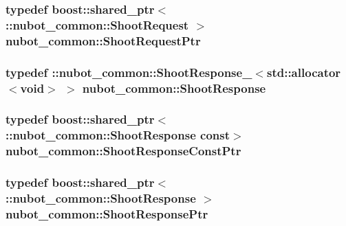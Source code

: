 \hypertarget{namespacenubot__common_aab5a1233cee5cd37a060be382351f99d}{
\subsubsection[{Shoot\-Request\-Ptr}]{\setlength{\rightskip}{0pt plus 5cm}typedef boost\-::shared\-\_\-ptr$<$ \-::{\bf nubot\-\_\-common\-::\-Shoot\-Request} $>$ {\bf nubot\-\_\-common\-::\-Shoot\-Request\-Ptr}}}\label{namespacenubot__common_aab5a1233cee5cd37a060be382351f99d}
\hypertarget{namespacenubot__common_a7fc7346cebf4ea3bdbc7c25438d3959e}{
\subsubsection[{Shoot\-Response}]{\setlength{\rightskip}{0pt plus 5cm}typedef \-::{\bf nubot\-\_\-common\-::\-Shoot\-Response\-\_\-}$<$std\-::allocator$<$void$>$ $>$ {\bf nubot\-\_\-common\-::\-Shoot\-Response}}}\label{namespacenubot__common_a7fc7346cebf4ea3bdbc7c25438d3959e}
\hypertarget{namespacenubot__common_aacaf2fc964aa85e0b87fd5721490e203}{
\subsubsection[{Shoot\-Response\-Const\-Ptr}]{\setlength{\rightskip}{0pt plus 5cm}typedef boost\-::shared\-\_\-ptr$<$ \-::{\bf nubot\-\_\-common\-::\-Shoot\-Response} const$>$ {\bf nubot\-\_\-common\-::\-Shoot\-Response\-Const\-Ptr}}}\label{namespacenubot__common_aacaf2fc964aa85e0b87fd5721490e203}
\hypertarget{namespacenubot__common_aead2ba57f157347012f6575c18c422d2}{
\subsubsection[{Shoot\-Response\-Ptr}]{\setlength{\rightskip}{0pt plus 5cm}typedef boost\-::shared\-\_\-ptr$<$ \-::{\bf nubot\-\_\-common\-::\-Shoot\-Response} $>$ {\bf nubot\-\_\-common\-::\-Shoot\-Response\-Ptr}}}\label{namespacenubot__common_aead2ba57f157347012f6575c18c422d2}
